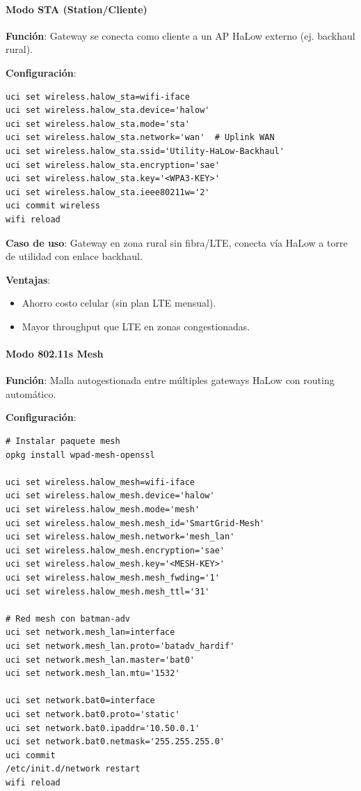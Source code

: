 \paragraph{Modo STA (Station/Cliente)}

\textbf{Función}: Gateway se conecta como cliente a un AP HaLow externo (ej. backhaul rural).

\textbf{Configuración}:
\begin{verbatim}
uci set wireless.halow_sta=wifi-iface
uci set wireless.halow_sta.device='halow'
uci set wireless.halow_sta.mode='sta'
uci set wireless.halow_sta.network='wan'  # Uplink WAN
uci set wireless.halow_sta.ssid='Utility-HaLow-Backhaul'
uci set wireless.halow_sta.encryption='sae'
uci set wireless.halow_sta.key='<WPA3-KEY>'
uci set wireless.halow_sta.ieee80211w='2'
uci commit wireless
wifi reload
\end{verbatim}

\textbf{Caso de uso}: Gateway en zona rural sin fibra/LTE, conecta vía HaLow a torre de utilidad con enlace backhaul.

\textbf{Ventajas}:
\begin{itemize}
    \item Ahorro costo celular (sin plan LTE mensual).
    \item Mayor throughput que LTE en zonas congestionadas.
\end{itemize}

\paragraph{Modo 802.11s Mesh}

\textbf{Función}: Malla autogestionada entre múltiples gateways HaLow con routing automático.

\textbf{Configuración}:
\begin{verbatim}
# Instalar paquete mesh
opkg install wpad-mesh-openssl

uci set wireless.halow_mesh=wifi-iface
uci set wireless.halow_mesh.device='halow'
uci set wireless.halow_mesh.mode='mesh'
uci set wireless.halow_mesh.mesh_id='SmartGrid-Mesh'
uci set wireless.halow_mesh.network='mesh_lan'
uci set wireless.halow_mesh.encryption='sae'
uci set wireless.halow_mesh.key='<MESH-KEY>'
uci set wireless.halow_mesh.mesh_fwding='1'
uci set wireless.halow_mesh.mesh_ttl='31'

# Red mesh con batman-adv
uci set network.mesh_lan=interface
uci set network.mesh_lan.proto='batadv_hardif'
uci set network.mesh_lan.master='bat0'
uci set network.mesh_lan.mtu='1532'

uci set network.bat0=interface
uci set network.bat0.proto='static'
uci set network.bat0.ipaddr='10.50.0.1'
uci set network.bat0.netmask='255.255.255.0'
uci commit
/etc/init.d/network restart
wifi reload
\end{verbatim}

